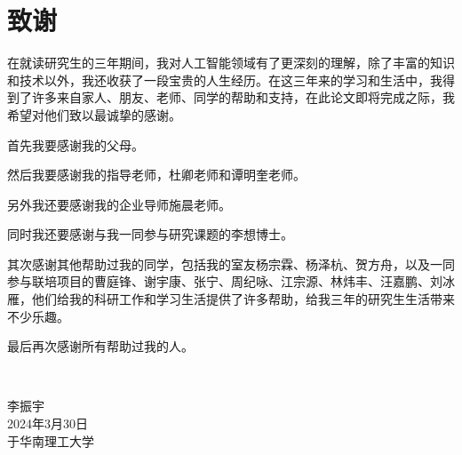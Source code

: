 \chapter{致\texorpdfstring{\quad}{}谢}

在就读研究生的三年期间，我对人工智能领域有了更深刻的理解，除了丰富的知识和技术以外，我还收获了一段宝贵的人生经历。在这三年来的学习和生活中，我得到了许多来自家人、朋友、老师、同学的帮助和支持，在此论文即将完成之际，我希望对他们致以最诚挚的感谢。

首先我要感谢我的父母。

然后我要感谢我的指导老师，杜卿老师和谭明奎老师。

另外我还要感谢我的企业导师施晨老师。

同时我还要感谢与我一同参与研究课题的李想博士。

其次感谢其他帮助过我的同学，包括我的室友杨宗霖、杨泽杭、贺方舟，以及一同参与联培项目的曹庭锋、谢宇康、张宁、周纪咏、江宗源、林炜丰、汪嘉鹏、刘冰雁，他们给我的科研工作和学习生活提供了许多帮助，给我三年的研究生生活带来不少乐趣。

最后再次感谢所有帮助过我的人。

~\\

\begin{minipage}[t]{0.945\textwidth}%
	\begin{flushright}
		李振宇\\
		2024年3月30日\\	%
		于华南理工大学
		\par\end{flushright}
\end{minipage}
